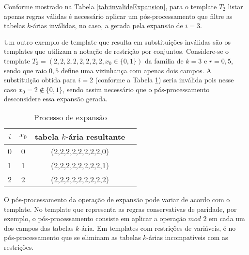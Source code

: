 Conforme mostrado na Tabela \ref{tab:invalideExpansion}, para o template $T_2$ listar apenas regras válidas é necessário aplicar um pós-processamento que filtre as tabelas $k$-árias inválidas, no caso, a gerada pela expansão de $i = 3$. 

Um outro exemplo de template que resulta em substituições inválidas são os templates que utilizam a notação de restrição por conjuntos. Considere-se o template $T_3 = (2,2,2,2,2,2,2,2,x_0\in \{0,1\})$ da família de $k=3$ e $r=0{,}5$, sendo que raio $0{,}5$ define uma vizinhança com apenas dois campos. A substituição obtida para $i = 2$ (conforme a Tabela \ref{tab:invalideExpansion2}) seria inválida pois nesse caso $x_0 = 2 \notin \{0,1\}$, sendo assim necessário que o pós-processamento desconsidere essa expansão gerada.
\begin{table}[h!]
\centering
\caption{Processo de expansão}
	\begin{tabular}{cccc}
    \toprule
	$i$ & $x_0$ & tabela $k$-ária resultante \\
    \midrule
	0	&	0	&	(2,2,2,2,2,2,2,2,0)	\\
	1	&	1	&	(2,2,2,2,2,2,2,2,1)	\\
	2	&	2	&	(2,2,2,2,2,2,2,2,2)	\\
    \bottomrule
	\end{tabular}
\label{tab:invalideExpansion2}
\end{table}

O pós-processamento da operação de expansão pode variar de acordo com o template. No template que representa as regras conservativas de paridade, por exemplo, o pós-processamento consiste em aplicar a operação $mod$ $2$ em cada um dos campos das tabelas $k$-ária. Em templates com restrições de variáveis, é no pós-processamento que se eliminam as tabelas $k$-árias incompatíveis com as restrições.

